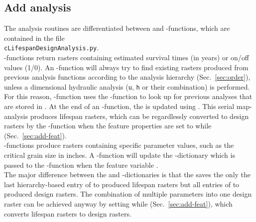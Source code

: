 \subsection{Add analysis} \label{sec:add-ana}
The analysis routines are differentiated between  and -functions, which are contained in the file \\\texttt{cLifespanDesignAnalysis.py}.\\
-functions return rasters containing estimated survival times (in years) or on/off values (1/0). An -function will always try to find existing rasters produced from previous analysis functions according to the analysis hierarchy (Sec.~\ref{sec:order}), unless a dimensional hydraulic analysis (\texttt{u}, \texttt{h} or their combination) is performed. For this reason, -function uses the -function to look up for previous analyses that are stored in . At the end of an -function, the  is updated using . This serial map-analysis produces lifespan rasters, which can be regardlessly converted to design rasters by the -function when the feature properties are set to  while  (Sec.~\ref{sec:add-feat}).\\
-functions produce rasters containing specific parameter values, such as the critical grain size in inches. A -function will update the -dictionary which is passed to the 
-function when the feature variable .\\
The major difference between the  and -dictionaries is that the  saves the only the last hierarchy-based entry of  to produced lifespan rasters but all entries of  to produced design rasters. The combination of multiple parameters into one design raster can be achieved anyway by setting  while  (Sec.~\ref{sec:add-feat}), which converts lifespan rasters to design rasters.\\

